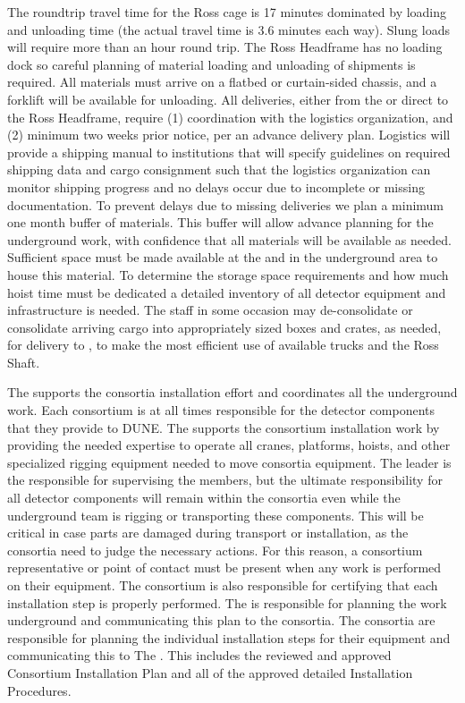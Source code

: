 The roundtrip travel time for the Ross cage is 17 minutes dominated by loading and unloading time (the actual travel time is 3.6 minutes each way).
Slung loads will require more than an hour round trip.
The Ross Headframe has no loading dock so careful planning of material loading and unloading of shipments is required.
All materials must arrive on a flatbed or curtain-sided chassis, and a
forklift will be available for unloading.
All deliveries, either from the  or direct to the Ross Headframe, require (1) coordination with the  logistics organization, and (2) minimum two weeks prior notice, per an advance delivery plan.
Logistics will provide a shipping manual to  institutions that will specify guidelines on required shipping data and cargo consignment such that the logistics organization can monitor shipping progress and no delays occur due to incomplete or missing documentation.
To prevent delays due to missing deliveries we plan a minimum one month buffer of materials.
This buffer will allow advance planning for the underground work, with confidence that all materials will be available as needed.
Sufficient space must be made available at the  and in the underground area to house this material.
To determine the storage space requirements and how much hoist time must be dedicated a detailed inventory of all detector equipment and infrastructure is needed.
The  staff in some occasion may de-consolidate or consolidate arriving cargo into appropriately sized boxes and crates, as needed, for delivery to , to make the most efficient use of available trucks and the Ross Shaft.

The  supports the consortia installation effort and coordinates all the  underground work.
Each consortium is at all times responsible for the detector components that they provide to DUNE.
The  supports the consortium installation work by providing the needed expertise to operate all cranes, platforms, hoists, and other specialized rigging equipment needed to move consortia equipment.
The  leader is the responsible for supervising the  members, but the ultimate responsibility for all detector components will remain within the consortia even while the underground team is rigging or transporting these components.
This will be critical in case parts are damaged during transport or installation, as the consortia need to judge the necessary actions.
For this reason, a consortium representative or point of contact must be present when any work is performed on their equipment.
The consortium is also responsible for certifying that each installation step is properly performed.
The  is responsible for planning the work underground and communicating this plan to the consortia.
The consortia are responsible for planning the individual installation steps for their equipment and communicating this to The .
This includes the reviewed and approved Consortium Installation Plan and all of the approved detailed Installation Procedures.








